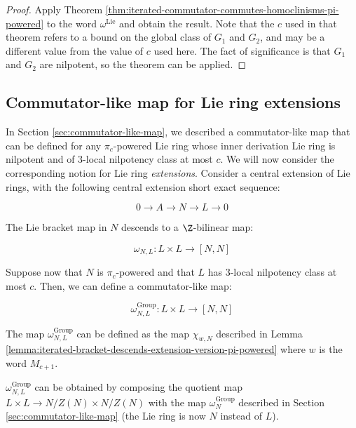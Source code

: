 \documentclass{ucetd}
\begin{document}
\begin{proof}
  Apply Theorem
  \ref{thm:iterated-commutator-commutes-homoclinisms-pi-powered} to
  the word $\omega^{\text{Lie}}$ and obtain the result. Note that the
  $c$ used in that theorem refers to a bound on the global class of
  $G_1$ and $G_2$, and may be a different value from the value of $c$
  used here. The fact of significance is that $G_1$ and $G_2$ are
  nilpotent, so the theorem can be applied.
\end{proof}


\subsection{Commutator-like map for Lie ring extensions}\label{sec:commutator-like-map-for-extensions}

In Section \ref{sec:commutator-like-map}, we described a
commutator-like map that can be defined for any $\pi_c$-powered Lie
ring whose inner derivation Lie ring is nilpotent and of $3$-local
nilpotency class at most $c$. We will now consider the corresponding
notion for Lie ring {\em extensions}. Consider a central extension of
Lie rings, with the following central extension short exact sequence:

$$0 \to A \to N \to L \to 0$$

The Lie bracket map in $N$ descends to a $\Z$-bilinear map:

$$\omega_{N,L}: L \times L \to [N,N]$$

Suppose now that $N$ is $\pi_c$-powered and that $L$ has $3$-local
nilpotency class at most $c$. Then, we can define a commutator-like
map:

$$\omega_{N,L}^{\text{Group}}: L \times L \to [N,N]$$

The map $\omega_{N,L}^{\text{Group}}$ can be defined as the map
$\chi_{w,N}$ described in Lemma
\ref{lemma:iterated-bracket-descends-extension-version-pi-powered}
where $w$ is the word $M_{c+1}$.

$\omega_{N,L}^{\text{Group}}$ can be obtained by composing the
quotient map $L \times L \to N/Z(N) \times N/Z(N)$ with the map
$\omega_N^{\text{Group}}$ described in Section
\ref{sec:commutator-like-map} (the Lie ring is now $N$ instead of
$L$).
\end{document}
